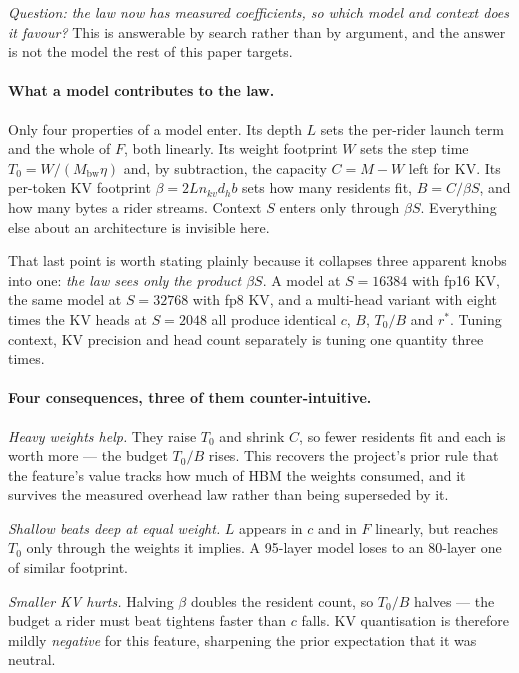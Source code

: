 \emph{Question: the law now has measured coefficients, so which model and context
does it favour?} This is answerable by search rather than by argument, and the
answer is not the model the rest of this paper targets.

\paragraph{What a model contributes to the law.} Only four properties of a model
enter. Its depth $L$ sets the per-rider launch term and the whole of $F$, both
linearly. Its weight footprint $W$ sets the step time $T_0 = W/(M_{\textrm{bw}}
\eta)$ and, by subtraction, the capacity $C = M - W$ left for KV. Its per-token
KV footprint $\beta = 2 L n_{kv} d_h b$ sets how many residents fit,
$B = C/\beta S$, and how many bytes a rider streams. Context $S$ enters only
through $\beta S$. Everything else about an architecture is invisible here.

That last point is worth stating plainly because it collapses three apparent
knobs into one: \emph{the law sees only the product $\beta S$}. A model at
$S{=}16384$ with fp16 KV, the same model at $S{=}32768$ with fp8 KV, and a
multi-head variant with eight times the KV heads at $S{=}2048$ all produce
identical $c$, $B$, $T_0/B$ and $r^{*}$. Tuning context, KV precision and head
count separately is tuning one quantity three times.

\paragraph{Four consequences, three of them counter-intuitive.}

\emph{Heavy weights help.} They raise $T_0$ and shrink $C$, so fewer residents
fit and each is worth more --- the budget $T_0/B$ rises. This recovers the
project's prior rule that the feature's value tracks how much of HBM the weights
consumed, and it survives the measured overhead law rather than being superseded
by it.

\emph{Shallow beats deep at equal weight.} $L$ appears in $c$ and in $F$
linearly, but reaches $T_0$ only through the weights it implies. A 95-layer
model loses to an 80-layer one of similar footprint.

\emph{Smaller KV hurts.} Halving $\beta$ doubles the resident count, so $T_0/B$
halves --- the budget a rider must beat tightens faster than $c$ falls. KV
quantisation is therefore mildly \emph{negative} for this feature, sharpening
the prior expectation that it was neutral.

